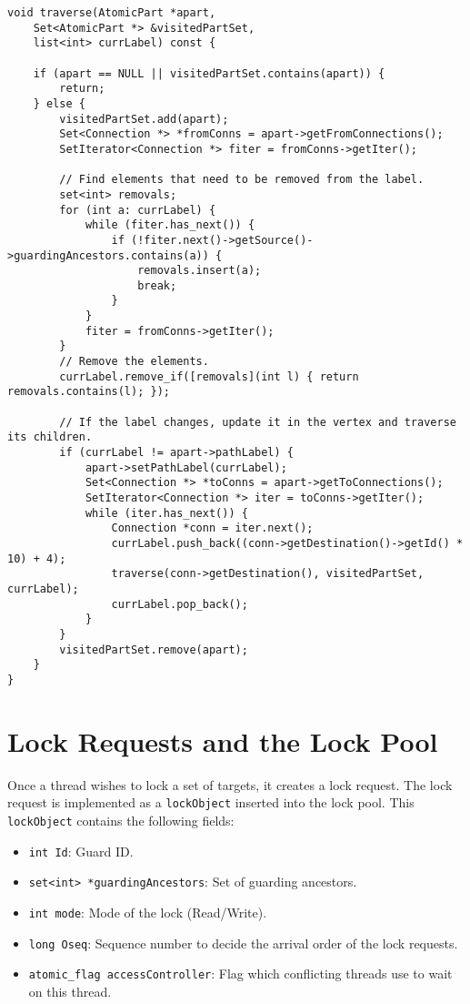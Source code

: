 \begin{lstlisting}[caption={Labelling an atomic part},label={lst:traverseAP}]
void traverse(AtomicPart *apart, 
    Set<AtomicPart *> &visitedPartSet, 
    list<int> currLabel) const {

    if (apart == NULL || visitedPartSet.contains(apart)) {
        return;
    } else {
        visitedPartSet.add(apart);
        Set<Connection *> *fromConns = apart->getFromConnections();
        SetIterator<Connection *> fiter = fromConns->getIter();

        // Find elements that need to be removed from the label.
        set<int> removals;
        for (int a: currLabel) {
            while (fiter.has_next()) {
                if (!fiter.next()->getSource()->guardingAncestors.contains(a)) {
                    removals.insert(a);
                    break;
                }
            }
            fiter = fromConns->getIter();
        }
        // Remove the elements.
        currLabel.remove_if([removals](int l) { return removals.contains(l); });

        // If the label changes, update it in the vertex and traverse its children.
        if (currLabel != apart->pathLabel) {
            apart->setPathLabel(currLabel);
            Set<Connection *> *toConns = apart->getToConnections();
            SetIterator<Connection *> iter = toConns->getIter();
            while (iter.has_next()) {
                Connection *conn = iter.next();
                currLabel.push_back((conn->getDestination()->getId() * 10) + 4);
                traverse(conn->getDestination(), visitedPartSet, currLabel);
                currLabel.pop_back();
            }
        }
        visitedPartSet.remove(apart);
    }
}
\end{lstlisting}




\section{Lock Requests and the Lock Pool}

Once a thread wishes to lock a set of targets, it creates a lock request. The lock request is implemented as a \texttt{lockObject} inserted into the lock pool. This \texttt{lockObject} contains the following fields:

\begin{itemize}
    \item \texttt{int Id}: Guard ID.
    \item \texttt{set<int> *guardingAncestors}: Set of guarding ancestors.
    \item \texttt{int mode}: Mode of the lock (Read/Write).
    \item \texttt{long Oseq}: Sequence number to decide the arrival order of the lock requests.
    \item \texttt{atomic\_flag accessController}: Flag which conflicting threads use to wait on this thread.
\end{itemize}

